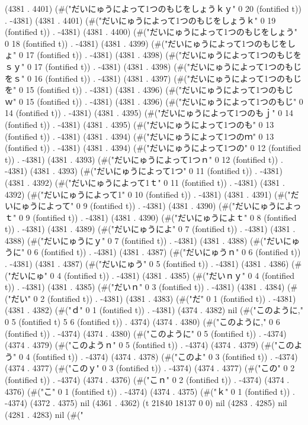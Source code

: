 (4381 . 4401) (#("だいにゅうによって1つのもじをしょうｋｙ" 0 20 (fontified t)) . -4381) (4381 . 4401) (#("だいにゅうによって1つのもじをしょうｋ" 0 19 (fontified t)) . -4381) (4381 . 4400) (#("だいにゅうによって1つのもじをしょう" 0 18 (fontified t)) . -4381) (4381 . 4399) (#("だいにゅうによって1つのもじをしょ" 0 17 (fontified t)) . -4381) (4381 . 4398) (#("だいにゅうによって1つのもじをｓｙ" 0 17 (fontified t)) . -4381) (4381 . 4398) (#("だいにゅうによって1つのもじをｓ" 0 16 (fontified t)) . -4381) (4381 . 4397) (#("だいにゅうによって1つのもじを" 0 15 (fontified t)) . -4381) (4381 . 4396) (#("だいにゅうによって1つのもじｗ" 0 15 (fontified t)) . -4381) (4381 . 4396) (#("だいにゅうによって1つのもじ" 0 14 (fontified t)) . -4381) (4381 . 4395) (#("だいにゅうによって1つのもｊ" 0 14 (fontified t)) . -4381) (4381 . 4395) (#("だいにゅうによって1つのも" 0 13 (fontified t)) . -4381) (4381 . 4394) (#("だいにゅうによって1つのｍ" 0 13 (fontified t)) . -4381) (4381 . 4394) (#("だいにゅうによって1つの" 0 12 (fontified t)) . -4381) (4381 . 4393) (#("だいにゅうによって1つｎ" 0 12 (fontified t)) . -4381) (4381 . 4393) (#("だいにゅうによって1つ" 0 11 (fontified t)) . -4381) (4381 . 4392) (#("だいにゅうによって1ｔ" 0 11 (fontified t)) . -4381) (4381 . 4392) (#("だいにゅうによって1" 0 10 (fontified t)) . -4381) (4381 . 4391) (#("だいにゅうによって" 0 9 (fontified t)) . -4381) (4381 . 4390) (#("だいにゅうによっｔ" 0 9 (fontified t)) . -4381) (4381 . 4390) (#("だいにゅうによｔ" 0 8 (fontified t)) . -4381) (4381 . 4389) (#("だいにゅうによ" 0 7 (fontified t)) . -4381) (4381 . 4388) (#("だいにゅうにｙ" 0 7 (fontified t)) . -4381) (4381 . 4388) (#("だいにゅうに" 0 6 (fontified t)) . -4381) (4381 . 4387) (#("だいにゅうｎ" 0 6 (fontified t)) . -4381) (4381 . 4387) (#("だいにゅう" 0 5 (fontified t)) . -4381) (4381 . 4386) (#("だいにゅ" 0 4 (fontified t)) . -4381) (4381 . 4385) (#("だいｎｙ" 0 4 (fontified t)) . -4381) (4381 . 4385) (#("だいｎ" 0 3 (fontified t)) . -4381) (4381 . 4384) (#("だい" 0 2 (fontified t)) . -4381) (4381 . 4383) (#("だ" 0 1 (fontified t)) . -4381) (4381 . 4382) (#("ｄ" 0 1 (fontified t)) . -4381) (4374 . 4382) nil (#("このように," 0 5 (fontified t) 5 6 (fontified t)) . 4374) (4374 . 4380) (#("このように," 0 6 (fontified t)) . -4374) (4374 . 4380) (#("このように" 0 5 (fontified t)) . -4374) (4374 . 4379) (#("このようｎ" 0 5 (fontified t)) . -4374) (4374 . 4379) (#("このよう" 0 4 (fontified t)) . -4374) (4374 . 4378) (#("このよ" 0 3 (fontified t)) . -4374) (4374 . 4377) (#("このｙ" 0 3 (fontified t)) . -4374) (4374 . 4377) (#("この" 0 2 (fontified t)) . -4374) (4374 . 4376) (#("こｎ" 0 2 (fontified t)) . -4374) (4374 . 4376) (#("こ" 0 1 (fontified t)) . -4374) (4374 . 4375) (#("ｋ" 0 1 (fontified t)) . -4374) (4372 . 4375) nil (4361 . 4362) (t 21840 18137 0 0) nil (4283 . 4285) nil (4281 . 4283) nil (#("
